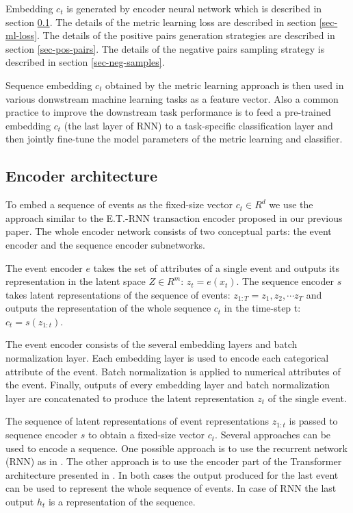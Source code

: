 \documentclass[sigconf]{acmart}
\begin{document}
Embedding $c_t$ is generated by encoder neural network which is described in section \ref{sec-enc-arch}. The details of the metric learning loss are described in section \ref{sec-ml-loss}. The details of the positive pairs generation strategies are described in section \ref{sec-pos-pairs}. The details of the negative pairs sampling strategy is described in section \ref{sec-neg-samples}.


Sequence embedding $c_t$ obtained by the metric learning approach is then used in various donwstream machine learning tasks as a feature vector. Also a common practice to improve the downstream task performance is to feed a pre-trained embedding $c_t$ (the last layer of RNN) to a task-specific classification layer and then jointly fine-tune the model parameters of the metric learning and classifier.

\subsection{Encoder architecture} \label{sec-enc-arch}

To embed a sequence of events as the fixed-size vector $c_t \in R^d$ we use the approach similar to the E.T.-RNN\cite{10.1145/3292500.3330693} transaction encoder proposed in our previous paper. The whole encoder network consists of two conceptual parts: the event encoder and the sequence encoder subnetworks.

The event encoder $e$ takes the set of attributes of a single event and outputs its representation in the latent space $Z \in R^m$: $z_t = e(x_t)$. The sequence encoder $s$ takes latent representations of the sequence of events: $ z_{1:T} = z_1, z_2, \cdots z_T $ and outputs the representation of the whole sequence $c_t$ in the time-step t: $ c_t = s(z_{1:t}) $.

The event encoder consists of the several embedding layers and batch normalization\cite{10.5555/3045118.3045167} layer. Each embedding layer is used to encode each categorical attribute of the event. Batch normalization is applied to numerical attributes of the event. Finally, outputs of every embedding layer and batch normalization layer are concatenated to produce the latent representation $z_t$ of the single event.

The sequence of latent representations of event representations $z_{1:t}$ is passed to sequence encoder $s$ to obtain a fixed-size vector $c_t$. Several approaches can be used to encode a sequence. One possible approach is to use the recurrent network (RNN) as in \cite{Sutskever:2014:SSL:2969033.2969173}. The other approach is to use the encoder part of the Transformer architecture presented in \cite{DBLP:journals/corr/VaswaniSPUJGKP17}. In both cases the output produced for the last event can be used to represent the whole sequence of events. In case of RNN the last output $h_t$ is a representation of the sequence.
\end{document}
